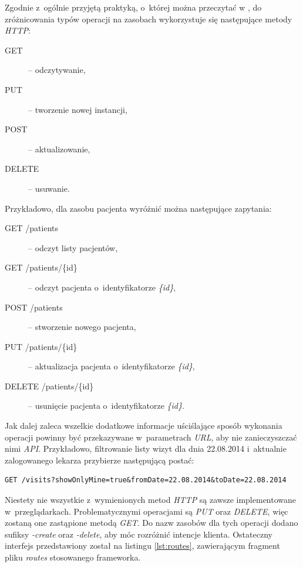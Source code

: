 \documentclass[11pt]{aghdpl}
\begin{document}
Zgodnie z~ogólnie przyjętą praktyką, o~której można przeczytać w \cite{WApiD}, do zróżnicowania typów operacji na zasobach wykorzystuje się następujące metody \emph{HTTP}:
\begin{description}
	\item[GET] -- odczytywanie,
	\item[PUT] -- tworzenie nowej instancji,
	\item[POST] -- aktualizowanie,
	\item[DELETE] -- usuwanie.
\end{description}

Przykładowo, dla zasobu pacjenta wyróżnić można następujące zapytania:
\begin{description}
\item[GET /patients] -- odczyt listy pacjentów,
\item[GET /patients/\{id\}] -- odczyt pacjenta o~identyfikatorze \emph{\{id\}},
\item[POST /patients] -- stworzenie nowego pacjenta,
\item[PUT /patients/\{id\}] -- aktualizacja pacjenta o~identyfikatorze \emph{\{id\}},
\item[DELETE /patients/\{id\}] -- usunięcie pacjenta o~identyfikatorze \emph{\{id\}}.
\end{description}

Jak dalej zaleca \cite{WApiD} wszelkie dodatkowe informacje uściślające sposób wykonania operacji powinny być przekazywane w~parametrach \emph{URL}, aby nie zanieczyszczać nimi \emph{API}. Przykładowo, filtrowanie listy wizyt dla dnia 22.08.2014 i~aktualnie zalogowanego lekarza przybierze następującą postać:
\begin{lstlisting}
GET /visits?showOnlyMine=true&fromDate=22.08.2014&toDate=22.08.2014
\end{lstlisting}

Niestety nie wszystkie z~wymienionych metod \emph{HTTP} są zawsze implementowane w~przeglądarkach. Problematycznymi operacjami są \emph{PUT} oraz \emph{DELETE}, więc zostaną one zastąpione metodą \emph{GET}. Do nazw zasobów dla tych operacji dodano sufiksy \emph{-create} oraz \emph{-delete}, aby móc rozróżnić intencje klienta.
Ostateczny interfejs przedstawiony został na listingu \ref{lst:routes}, zawierającym fragment pliku \emph{routes} stosowanego frameworka.
\end{document}
